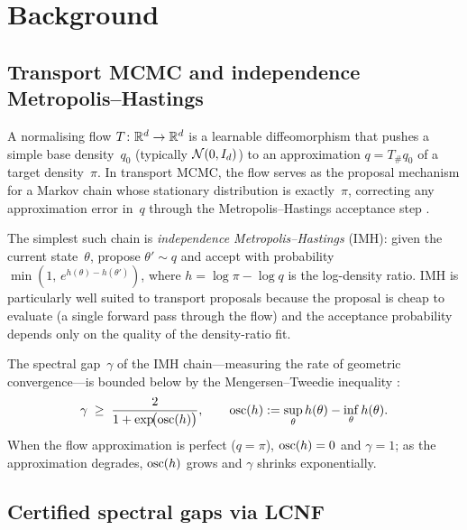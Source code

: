 %  

\section{Background}
\label{sec:background}


\subsection{Transport MCMC and independence Metropolis--Hastings}
\label{sec:bg_transport}

A normalising flow $T\colon \mathbb{R}^d \to \mathbb{R}^d$ is a learnable
diffeomorphism that pushes a simple base density~$q_0$
(typically $\mathcal{N}(0, I_d)$) to an approximation
$q = T_{\#}q_0$ of a target density~$\pi$.
In transport MCMC, the flow serves as the proposal mechanism
for a Markov chain whose stationary distribution is
exactly~$\pi$, correcting any approximation error in~$q$
through the Metropolis--Hastings acceptance step
\citep{Parno2018,Hoffman2019,Gabrie2022}.

The simplest such chain is \emph{independence
Metropolis--Hastings} (IMH): given the current state~$\theta$,
propose $\theta' \sim q$ and accept with probability
$\min(1,\, e^{h(\theta) - h(\theta')})$, where
$h = \log\pi - \log q$ is the log-density ratio.
IMH is particularly well suited to transport proposals because
the proposal is cheap to evaluate (a single forward pass through
the flow) and the acceptance probability depends only on the
quality of the density-ratio fit.

The spectral gap~$\gamma$ of the IMH chain---measuring the
rate of geometric convergence---is bounded below by the
Mengersen--Tweedie inequality \citep{MengersenTweedie1996}:
\begin{equation}\label{eq:mt_bound}
  \gamma
  \;\geq\;
  \frac{2}{1 + \exp\!\bigl(\mathrm{osc}(h)\bigr)},
  \qquad
  \mathrm{osc}(h)
  := \sup_\theta h(\theta) - \inf_\theta h(\theta).
\end{equation}
When the flow approximation is perfect ($q = \pi$),
$\mathrm{osc}(h) = 0$ and $\gamma = 1$; as the approximation degrades,
$\mathrm{osc}(h)$ grows and $\gamma$ shrinks exponentially.


\subsection{Certified spectral gaps via LCNF}
\label{sec:bg_lcnf}

